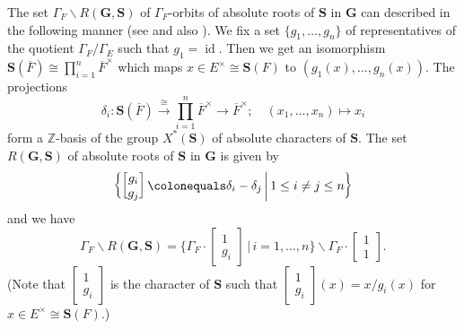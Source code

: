 \documentclass{amsart}
\newcommand{\Z}{\mathbb{Z}}
\newcommand{\bfG}{\mathbf{G}}
\newcommand{\bfS}{\mathbf{S}}
\DeclareMathOperator{\id}{id}
\theoremstyle{plain}
\theoremstyle{definition}
\theoremstyle{remark}
\theoremstyle{theorem}
\begin{document}
The set $\Gamma_{F}\backslash R(\bfG,\bfS)$ of $\Gamma_{F}$-orbits of absolute roots of $\bfS$ in $\bfG$ can described in the following manner (see \cite[Section 3.1]{OT21} and also \cite[Section 3.2]{Tam16}).
We fix a set $\{g_{1},\ldots,g_{n}\}$ of representatives of the quotient $\Gamma_{F}/\Gamma_{E}$ such that $g_{1}=\id$.
Then we get an isomorphism $\bfS(\overline{F})\cong\prod_{i=1}^{n} \overline{F}^{\times}$ which maps $x\in E^{\times}\cong\bfS(F)$ to $(g_{1}(x),\ldots,g_{n}(x))$.
The projections 
\[
\delta_{i}
\colon 
\bfS(\overline{F})\xrightarrow{\cong}\prod_{i=1}^{n} \overline{F}^{\times}\rightarrow \overline{F}^{\times}
;\quad
(x_{1},\ldots,x_{n})\mapsto x_{i}
\]
form a $\Z$-basis of the group $X^{\ast}(\bfS)$ of absolute characters of $\bfS$.
The set $R(\bfG,\bfS)$ of absolute roots of $\bfS$ in $\bfG$ is given by
\[
\biggl\{
\begin{bmatrix}g_{i}\\g_{j}\end{bmatrix}\colonequals \delta_{i}-\delta_{j}
\,\bigg\vert\,
1\leq i \neq j \leq n
\biggr\}
\]
and we have
\[
\Gamma_{F}\backslash R(\bfG,\bfS)
=\biggl\{
\Gamma_{F}\cdot\begin{bmatrix}1\\g_{i}\end{bmatrix}
\,\bigg\vert\,
i=1,\ldots,n
\biggr\}\smallsetminus \Gamma_{F}\cdot\begin{bmatrix}1\\1\end{bmatrix}.
\]
(Note that $\begin{bmatrix}1\\g_{i}\end{bmatrix}$ is the character of $\bfS$ such that $\begin{bmatrix}1\\g_{i}\end{bmatrix}(x)=x/g_{i}(x)$ for $x\in E^{\times}\cong\bfS(F)$.)
\end{document}
